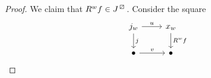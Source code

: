 \begin{proof}
    We claim that $R^wf \in J^{\lift{}}$.
    Consider the square 
    \[
    \begin{tikzcd}
        j_w
        \ar[r,"u"]
        \ar[d,"j"]
        &
        x_w
        \ar[d, "R^wf"]
        \\
        \bullet 
        \ar[r,"v"]
        &
        \bullet
    \end{tikzcd}
    \]
\end{proof}